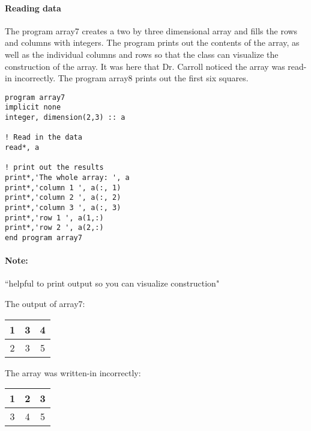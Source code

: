 \documentclass[11pt]{article}
\begin{document}
\paragraph{Reading data}The program array7 creates a two by three dimensional array and fills the rows and columns with integers. The program prints out the contents of the array, as well as the individual columns and rows so that the class can visualize the construction of the array. It was here that Dr. Carroll noticed the array was read-in incorrectly. The program array8 prints out the first six squares.\\

\noindent
\begin{minipage}[t]{0.45\textwidth}
\begin{lstlisting}
program array7
implicit none
integer, dimension(2,3) :: a

! Read in the data
read*, a

! print out the results
print*,'The whole array: ', a
print*,'column 1 ', a(:, 1)
print*,'column 2 ', a(:, 2)
print*,'column 3 ', a(:, 3)
print*,'row 1 ', a(1,:)
print*,'row 2 ', a(2,:)
end program array7
\end{lstlisting}
\vfill
	\end{minipage}
\hfill
\begin{minipage}[t]{0.45\textwidth}
\paragraph{Note:}``helpful to print output so you can visualize construction"\\

\par The output of array7:\\
\begin{center}
\begin{tabular}{ |c|c|c| }
	\hline
	1 & 3 & 4\\
	\hline
	2 & 3 & 5\\
	\hline
\end{tabular}
\end{center}

\par The array was written-in incorrectly:
\begin{center}
\begin{tabular}{ |c|c|c| }
	\hline
	1 & 2 & 3\\
	\hline
	3 & 4 & 5\\
	\hline
\end{tabular}
\end{center}
\end{minipage}
\end{document}
